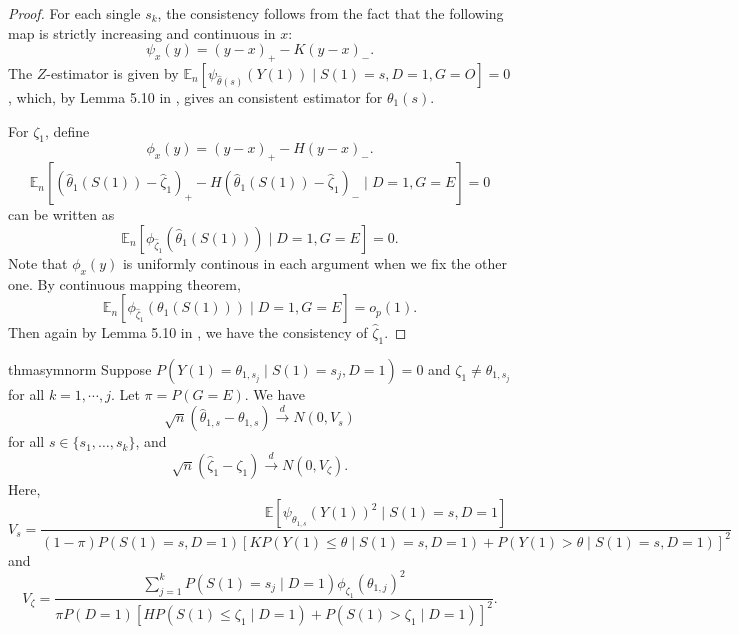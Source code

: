 \documentclass[12pt]{article}
\newcommand{\Ep}{\mathbb{E}}
\newcommand{ \littleop}{o_p}
\begin{document}
	\begin{proof}
		For each single $s_k$, the consistency follows from the fact that the following map is strictly increasing and continuous in $x$:
		$$\psi_x(y) = (y - x)_+ - K (y - x)_-.$$
		The $Z$-estimator is given by $\Ep_n[\psi_{\hat{\theta}(s)}(Y(1)) \mid S(1) = s, D = 1, G = O] = 0$, which, by Lemma 5.10 in \textcite{van2000asymptotic}, gives an consistent estimator for $\theta_1(s)$.
		
		For $\zeta_1$, define $$\phi_x(y) = (y - x)_+ - H (y - x)_-.$$
		\begin{equation*}
		\mathbb{E}_n\left[(\hat{\theta}_1(S(1))-\hat{\zeta}_1)_{+}-H(\hat{\theta}_1(S(1))-\hat{\zeta}_1)_{-} \mid D=1, G = E\right] = 0
		\end{equation*} 
		can be written as 
		\begin{equation*}
		\mathbb{E}_n\left[ \phi_{\hat{\zeta}_1}(\hat{\theta}_1(S(1)))\mid D=1, G = E\right] = 0.
		\end{equation*}
		Note that $\phi_{x}(y)$ is uniformly continous in each argument when we fix the other one. By continuous mapping theorem,
		\begin{equation*}
		\mathbb{E}_n\left[ \phi_{\hat{\zeta}_1}(\theta_1(S(1)))\mid D=1, G = E\right] = \littleop(1).
		\end{equation*}
		Then again by Lemma 5.10 in \textcite{van2000asymptotic}, we have the consistency of $\hat{\zeta}_1$.
	\end{proof}
	
	\begin{restatable}{thm}{asymnorm}
		\label{asymnorm}
		Suppose $P(Y(1) = \theta_{1,s_j} \mid S(1) = s_j, D = 1) = 0$ and $\zeta_1 \neq \theta_{1,s_j}$ for all $k = 1, \cdots, j$. Let $\pi = P(G = E)$. We have
		$$\sqrt{n}(\hat{\theta}_{1,s} - \theta_{1,s}) \overset{d}{\to} N(0,V_s)$$ for all $s \in \{s_1, \ldots, s_k\}$, and $$\sqrt{n}(\hat{\zeta}_1-\zeta_1) \overset{d}{\to} N(0,V_{\zeta}).$$ 
		Here, 
		$$V_s = \frac{\Ep[\psi_{\theta_{1,s}}(Y(1))^2 \mid S(1) = s, D = 1]}{(1-\pi) P(S(1)=s, D=1) [K P(Y(1) \leq \theta \mid S(1) = s, D = 1) + P(Y(1) > \theta \mid S(1) = s, D = 1)]^2}$$ and
		$$V_{\zeta} = \frac{\sum_{j=1}^k P(S(1) = s_j \mid D = 1)\phi_{\zeta_1}(\theta_{1,j})^2}{\pi P(D = 1)[H P(S(1) \leq \zeta_1 \mid D = 1) + P(S(1)  > \zeta_1 \mid D = 1)]^2}.$$
	\end{restatable}
	
\end{document}
